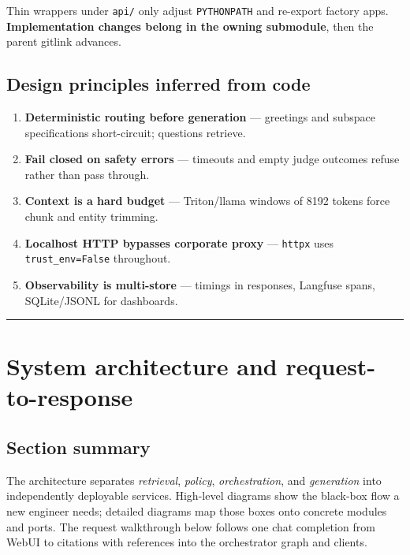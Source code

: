 \documentclass[
  11pt,
]{article}
\providecommand{\tightlist}{%
  \setlength{\itemsep}{0pt}\setlength{\parskip}{0pt}}
\begin{document}
Thin wrappers under \texttt{api/} only adjust \texttt{PYTHONPATH} and
re-export factory apps. \textbf{Implementation changes belong in the
owning submodule}, then the parent gitlink advances.

\subsection{Design principles inferred from
code}\label{design-principles-inferred-from-code}

\begin{enumerate}
\def\labelenumi{\arabic{enumi}.}
\tightlist
\item
  \textbf{Deterministic routing before generation} --- greetings and
  subspace specifications short-circuit; questions retrieve.\\
\item
  \textbf{Fail closed on safety errors} --- timeouts and empty judge
  outcomes refuse rather than pass through.\\
\item
  \textbf{Context is a hard budget} --- Triton/llama windows of 8192
  tokens force chunk and entity trimming.\\
\item
  \textbf{Localhost HTTP bypasses corporate proxy} --- \texttt{httpx}
  uses \texttt{trust\_env=False} throughout.\\
\item
  \textbf{Observability is multi-store} --- timings in responses,
  Langfuse spans, SQLite/JSONL for dashboards.
\end{enumerate}

\begin{center}\rule{0.5\linewidth}{0.5pt}\end{center}

\section{System architecture and
request-to-response}\label{system-architecture-and-request-to-response}

\subsection{Section summary}\label{section-summary-1}

The architecture separates \emph{retrieval}, \emph{policy},
\emph{orchestration}, and \emph{generation} into independently
deployable services. High-level diagrams show the black-box flow a new
engineer needs; detailed diagrams map those boxes onto concrete modules
and ports. The request walkthrough below follows one chat completion
from WebUI to citations with references into the orchestrator graph and
clients.
\end{document}

